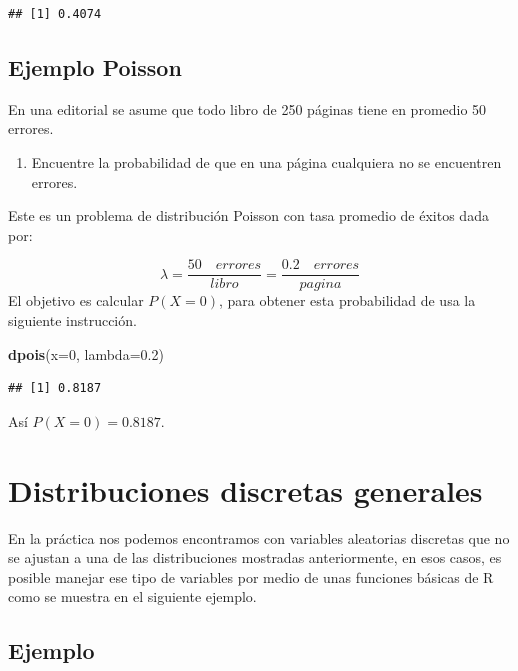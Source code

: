 \documentclass[10pt,]{krantz}
\makeatletter
\newenvironment{Shaded}{\begin{snugshade}}{\end{snugshade}}
\newcommand{\KeywordTok}[1]{\textcolor[rgb]{0.13,0.29,0.53}{\textbf{{#1}}}}
\newcommand{\DataTypeTok}[1]{\textcolor[rgb]{0.13,0.29,0.53}{{#1}}}
\newcommand{\DecValTok}[1]{\textcolor[rgb]{0.00,0.00,0.81}{{#1}}}
\newcommand{\FloatTok}[1]{\textcolor[rgb]{0.00,0.00,0.81}{{#1}}}
\newcommand{\NormalTok}[1]{{#1}}
\providecommand{\tightlist}{%
  \setlength{\itemsep}{0pt}\setlength{\parskip}{0pt}}
\let\proglang=\textsf
\newenvironment{kframe}{%
\medskip{}
\setlength{\fboxsep}{.8em}
 \def\at@end@of@kframe{}%
 \ifinner\ifhmode%
  \def\at@end@of@kframe{\end{minipage}}%
  \begin{minipage}{\columnwidth}%
 \fi\fi%
 \def\FrameCommand##1{\hskip\@totalleftmargin \hskip-\fboxsep
 \colorbox{shadecolor}{##1}\hskip-\fboxsep
     \hskip-\linewidth \hskip-\@totalleftmargin \hskip\columnwidth}%
 \MakeFramed {\advance\hsize-\width
   \@totalleftmargin\z@ \linewidth\hsize
   \@setminipage}}%
 {\par\unskip\endMakeFramed%
 \at@end@of@kframe}
\renewenvironment{Shaded}{\begin{kframe}}{\end{kframe}}
\makeatother
\begin{document}
\begin{verbatim}
## [1] 0.4074
\end{verbatim}

\subsection*{Ejemplo Poisson}\label{ejemplo-poisson}


En una editorial se asume que todo libro de 250 páginas tiene en
promedio 50 errores.

\begin{enumerate}
\def\labelenumi{\arabic{enumi})}
\tightlist
\item
  Encuentre la probabilidad de que en una página cualquiera no se
  encuentren errores.
\end{enumerate}

Este es un problema de distribución Poisson con tasa promedio de éxitos
dada por:

\[\lambda=\frac{50 \quad errores}{libro}=\frac{0.2 \quad errores}{pagina}\]
El objetivo es calcular \(P(X=0)\), para obtener esta probabilidad de
usa la siguiente instrucción.

\begin{Shaded}
\begin{Highlighting}[]
\KeywordTok{dpois}\NormalTok{(}\DataTypeTok{x=}\DecValTok{0}\NormalTok{, }\DataTypeTok{lambda=}\FloatTok{0.2}\NormalTok{)}
\end{Highlighting}
\end{Shaded}

\begin{verbatim}
## [1] 0.8187
\end{verbatim}

Así \(P(X=0)=0.8187\).

\section{Distribuciones discretas
generales}\label{distribuciones-discretas-generales}

En la práctica nos podemos encontramos con variables aleatorias
discretas que no se ajustan a una de las distribuciones mostradas
anteriormente, en esos casos, es posible manejar ese tipo de variables
por medio de unas funciones básicas de \proglang{R} como se muestra en
el siguiente ejemplo.

\subsection*{Ejemplo}\label{ejemplo-47}
\end{document}

